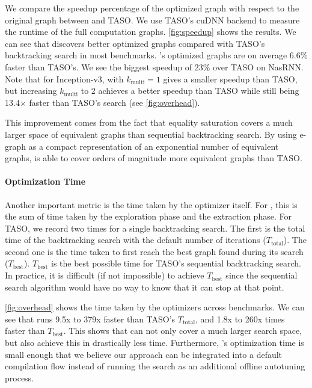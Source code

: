 We compare the speedup percentage of the optimized graph with respect to the original graph between \ourname{} and TASO.
We use TASO's cuDNN backend to measure the runtime of the full computation graphs.
\autoref{fig:speedup} shows the results.
We can see that \ourname{} discovers better optimized graphs compared with TASO's backtracking search in most benchmarks.
\ourname{}'s optimized graphs are on average 6.6\% faster than TASO's. We see the biggest speedup of 23\% over TASO on NasRNN.
Note that for Inception-v3, \ourname{} with $k_{\textrm{multi}}=1$ gives a smaller speedup than TASO,
but increasing $k_{\textrm{multi}}$ to 2 achieves a better speedup than TASO
while still being 13.4$\times$ faster than TASO's search (see \autoref{fig:overhead}).

This improvement comes from the fact that equality saturation covers a much larger space of equivalent graphs than sequential backtracking search.
By using e-graph as a compact representation of an exponential number of equivalent graphs, \ourname{} is able to cover orders of magnitude more equivalent graphs than TASO.

\paragraph{Optimization Time}
\label{sec:time}

Another important metric is the time taken by the optimizer itself.
For \ourname{}, this is the sum of time taken by the exploration phase and the extraction phase.
For TASO, we record two times for a single backtracking search.
The first is the total time of the backtracking search with the default number of iterations ($T_{\textrm{total}}$).
The second one is the time taken to first reach the best graph found during its search ($T_{\textrm{best}}$).
$T_{\textrm{best}}$ is the best possible time for TASO's sequential backtracking search.
In practice, it is difficult (if not impossible) to achieve $T_{\textrm{best}}$ since the sequential search algorithm would have no way to know that it can stop at that point.

\autoref{fig:overhead} shows the time taken by the optimizers across benchmarks.
We can see that \ourname{} runs 9.5x to 379x faster than TASO's $T_{\textrm{total}}$, and 1.8x to 260x times faster than $T_{\textrm{best}}$.
This shows that \ourname{} can not only cover a much larger search space, but also achieve this in drastically less time.
Furthermore, \ourname{}'s optimization time is small enough that we believe our approach can be integrated into a default compilation flow instead of running the search as an additional offline autotuning process.


